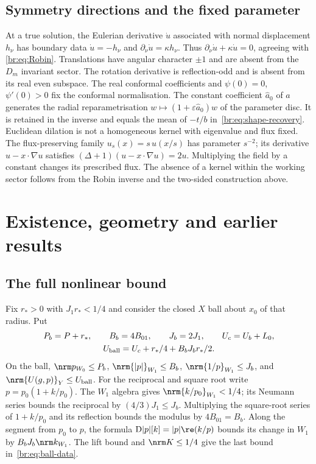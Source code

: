\subsection{Symmetry directions and the fixed parameter}\label{br:sec:kernels}
At a true solution, the Eulerian derivative $\dot u$ associated with
normal displacement $h_\nu$ has boundary data
$\dot u=-h_\nu$ and $\partial_\nu\dot u=\kappa h_\nu$.
Thus $\partial_\nu\dot u+\kappa\dot u=0$, agreeing with
\eqref{br:eq:Robin}. Translations have angular character $\pm1$ and
are absent from the $D_m$ invariant sector. The rotation derivative is
reflection-odd and is absent from its real even subspace.
The real conformal coefficients and $\psi(0)=0$, $\psi'(0)>0$ fix the
conformal normalisation.
The constant coefficient $\widehat a_0$ of $a$ generates the radial
reparametrisation $w\mapsto(1+\varepsilon\widehat a_0)w$ of the parameter
disc. It is retained in the inverse and equals the mean of $-t/b$
in~\eqref{br:eq:shape-recovery}. Euclidean dilation is not a homogeneous kernel with
eigenvalue and flux fixed. The flux-preserving family
$u_s(x)=s\,u(x/s)$ has parameter $s^{-2}$; its derivative
$u-x\cdot\nabla u$ satisfies $(\Delta+1)(u-x\cdot\nabla u)=2u$.
Multiplying the field by a constant changes its prescribed flux.
The absence of a kernel within the working sector follows from the
Robin inverse and the two-sided construction above.
\section{Existence, geometry and earlier results}\label{br:sec:existence}
\subsection{The full nonlinear bound}\label{br:sec:nonlinear}
Fix $r_*>0$ with $J_1r_*<1/4$ and consider the closed $X$ ball about
$x_0$ of that radius. Put
\begin{equation}\label{br:eq:ball-data}
 \begin{gathered}
 P_b=P+r_*,\qquad B_b=4B_{01},\qquad J_b=2J_1,\qquad U_c=U_b+L_0,\\
 U_{\rm ball}=U_c+r_*/4+B_bJ_br_*/2.
 \end{gathered}
\end{equation}
On the ball, $\nrm p_{W_0}\le P_b$, $\nrm{|p|}_{W_1}\le B_b$,
$\nrm{1/p}_{W_1}\le J_b$, and $\nrm{U(g,p)}_Y\le U_{\rm ball}$.
For the reciprocal and square root write $p=p_0(1+k/p_0)$.
The $W_1$ algebra gives $\nrm{k/p_0}_{W_1}<1/4$; its Neumann series
bounds the reciprocal by $(4/3)J_1\le J_b$. Multiplying the square-root
series of $1+k/p_0$ and its reflection bounds the modulus by
$4B_{01}=B_b$. Along the segment from $p_0$ to $p$, the formula
$\mathrm D|p|[k]=|p|\re(k/p)$ bounds its change in $W_1$ by
$B_bJ_b\nrm k_{W_1}$. The lift bound and $\nrm K\le1/4$ give the last
bound in~\eqref{br:eq:ball-data}.

